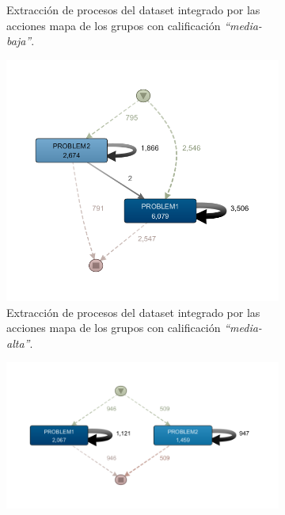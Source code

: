 \begin{figure}[H]
\begin{subfigure}[t]{0.60\textwidth}
    \caption{Extracción de procesos del dataset integrado por las acciones mapa de los grupos con calificación \emph{``media-baja''}.}
    \label{fig:mapMidLowGrades}
  \end{subfigure}
  \hfill
  \begin{subfigure}[t]{0.60\textwidth}
    \includegraphics[width=1.10\textwidth, height=1.10\textwidth]{imagenes/DISCO_map/Dataset FusionadoMidHighGrades.png}
    \caption{Extracción de procesos del dataset integrado por las acciones mapa de los grupos con calificación \emph{``media-alta''}.}
    \label{fig:mapMidHighGrades}
  \end{subfigure}
  \hfill
  \begin{subfigure}[t]{0.60\textwidth}
    \includegraphics[width=1.10\textwidth, height=0.80\textwidth]{imagenes/DISCO_map/Dataset FusionadoHighGrades.png}

\end{subfigure}
\end{figure}
